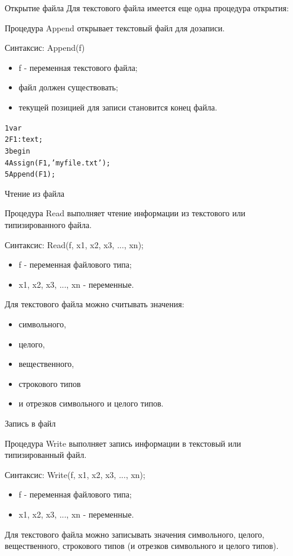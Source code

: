 \documentclass{beamer}
\begin{document}
\begin{frame}[fragile]{Открытие файла}
Для текстового файла имеется еще одна процедура открытия:
\begin{block}{Процедура Append}
открывает текстовый файл для дозаписи.
\end{block}
Синтаксис: Append(f)
\begin{itemize}
\item f - переменная текстового файла;
\item файл должен существовать;
\item текущей позицией для записи становится конец файла.
\end{itemize}
\begin{alltt}
 1 var                  
 2   F1: text;
 3 begin
 4   Assign(F1, 'myfile.txt');
 5   Append(F1);
\end{alltt}
\end{frame} 

\begin{frame}[fragile]{Чтение из файла}
\begin{block}{Процедура Read}
выполняет чтение информации из текстового или типизированного файла.
\end{block}
Синтаксис: Read(f, x1, x2, x3, $...$, xn);
\begin{itemize}
\item f - переменная файлового типа;
\item x1, x2, x3, $...$, xn - переменные.
\end{itemize}
Для текстового файла можно считывать значения:
\begin{itemize}
\item символьного, 
\item целого, 
\item вещественного, 
\item строкового типов 
\item и отрезков символьного и целого типов.
\end{itemize} 
\end{frame} 

\begin{frame}[fragile]{Запись в файл}
\begin{block}{Процедура Write}
выполняет запись информации в текстовый или типизированный файл.
\end{block}
Синтаксис: Write(f, x1, x2, x3, $...$, xn);
\begin{itemize}
\item f - переменная файлового типа;
\item x1, x2, x3, $...$, xn - переменные.
\end{itemize}
Для текстового файла можно записывать значения символьного, целого, вещественного, строкового типов (и отрезков символьного и целого типов).
\end{frame} 
\end{document}
